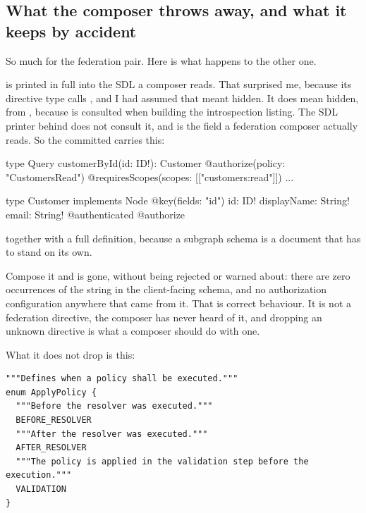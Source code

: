 \subsection*{What the composer throws away, and what it keeps by accident}

%
So much for the federation pair. Here is what happens to the other one.

 is printed in full into the SDL a composer reads. That
surprised me, because its directive type calls , and I had
assumed that meant hidden. It does mean hidden, from
, because  is
consulted when building the introspection listing. The SDL printer behind
 does not consult it, and 
is the field a federation composer actually reads. So the committed
 carries this:

\begin{graphqlsdl}[fontsize=\footnotesize]
type Query {
  customerById(id: ID!): Customer
    @authorize(policy: "CustomersRead")
    @requiresScopes(scopes: [["customers:read"]])
  ...
}

type Customer implements Node @key(fields: "id") {
  id: ID!
  displayName: String!
  email: String! @authenticated @authorize
}
\end{graphqlsdl}

together with a full  definition, because a
subgraph schema is a document that has to stand on its own.

Compose it and  is gone, without being rejected or warned
about: there are zero occurrences of the string in the client-facing schema, and
no authorization configuration anywhere that came from it. That is correct
behaviour. It is not a federation directive, the composer has never heard of it,
and dropping an unknown directive is what a composer should do with one.

What it does not drop is this:

\begin{verbatim}
"""Defines when a policy shall be executed."""
enum ApplyPolicy {
  """Before the resolver was executed."""
  BEFORE_RESOLVER
  """After the resolver was executed."""
  AFTER_RESOLVER
  """The policy is applied in the validation step before the execution."""
  VALIDATION
}
\end{verbatim}

